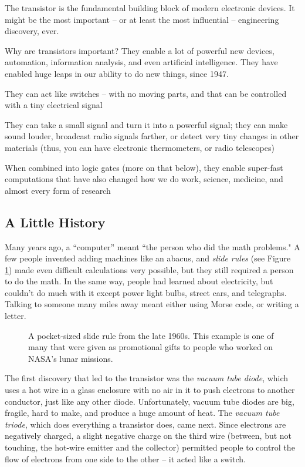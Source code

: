 The transistor is the fundamental building block of modern electronic devices. It might be the most important -- or at least the most influential -- engineering discovery, ever.

Why are transistors important? They enable a lot of powerful new devices, automation, information analysis, and even artificial intelligence. They have enabled huge leaps in our ability to do new things, since 1947. 

\bi

\+ They can act like switches -- with no moving parts, and that can be controlled with a tiny electrical signal

\+ They can take a small signal and turn it into a powerful signal; they can make sound louder, broadcast radio signals farther, or detect very tiny changes in other materials (thus, you can have electronic thermometers, or radio telescopes)

\+ When combined into logic gates (more on that below), they enable super-fast computations that have also changed how we do work, science, medicine, and almost every form of research

\ei

\subsection*{A Little History}

Many years ago, a ``computer'' meant ``the person who did the math problems." A few people invented adding machines like an abacus, and \emph{slide rules} (see Figure \ref{fig:sliderule}) made even difficult calculations very possible, but they still required a person to do the math. In the same way, people had learned about electricity, but couldn't do much with it except power light bulbs, street cars, and telegraphs. Talking to someone many miles away meant either using Morse code, or writing a letter. 

\begin{figure}[!ht]
\begin{center}
\end{center}
\caption{A pocket-sized slide rule from the late 1960s. This example is one of many that were given as promotional gifts to people who worked on NASA's lunar missions.}
\label{fig:sliderule}
\end{figure}

The first discovery that led to the transistor was the \emph{vacuum tube diode}, which uses a hot wire in a glass enclosure with no air in it to push electrons to another conductor, just like any other diode. Unfortunately, vacuum tube diodes are big, fragile, hard to make, and produce a huge amount of heat. The \emph{vacuum tube triode}, which does everything a transistor does, came next. Since electrons are negatively charged, a slight negative charge on the third wire (between, but not touching, the hot-wire emitter and the collector) permitted people to control the flow of electrons from one side to the other -- it acted like a switch. 

